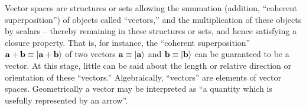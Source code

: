 Vector spaces are structures or sets  allowing the
summation (addition,  ``coherent superposition'') of objects called ``vectors,'' and the multiplication
of these objects by scalars --  thereby remaining in these structures or sets, and hence satisfying a closure property.
That is, for instance, the ``coherent superposition''  ${\bf a} + {\bf b}\equiv \vert {\bf a} + {\bf b} \rangle $
of two vectors ${\bf a} \equiv \vert {\bf a} \rangle $ and ${\bf b} \equiv \vert {\bf b} \rangle $ can be guaranteed to
be a vector.
At this stage, little can be said about the length or relative direction or orientation of these ``vectors.''
Algebraically, ``vectors'' are elements of vector spaces.
Geometrically a vector may be interpreted as ``a quantity which is usefully represented by an arrow''.\cite{Weinreich}



